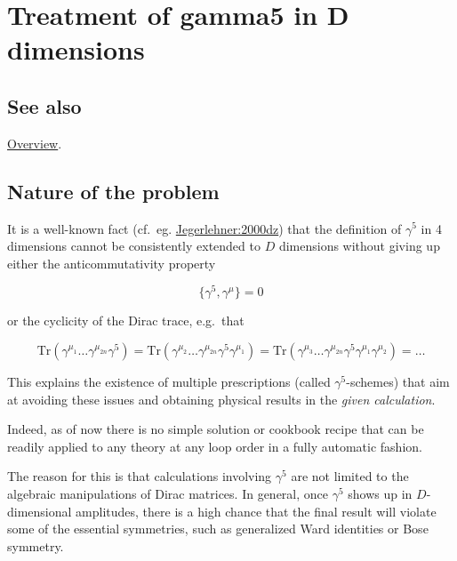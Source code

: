 \documentclass[../FeynCalcManual.tex]{subfiles}
\begin{document}
\hypertarget{treatment of gamma5 in d dimensions}{
\section{Treatment of gamma5 in D dimensions}\label{treatment of gamma5 in d dimensions}}

\subsection{See also}

\hyperlink{toc}{Overview}.

\hypertarget{nature-of-the-problem}{%
\subsection{Nature of the problem}\label{nature-of-the-problem}}

It is a well-known fact (cf.~eg.
\href{https://arxiv.org/pdf/hep-th/0005255}{Jegerlehner:2000dz}) that
the definition of \(\gamma^5\) in 4 dimensions cannot be consistently
extended to \(D\) dimensions without giving up either the
anticommutativity property

\begin{equation}
\{\gamma^5, \gamma^\mu\} = 0
\end{equation}

or the cyclicity of the Dirac trace, e.g.~that

\begin{equation}
\mathrm{Tr}( \gamma^{\mu_1} \ldots \gamma^{\mu_{2n}} \gamma^5 ) = \mathrm{Tr}( \gamma^{\mu_2} \ldots \gamma^{\mu_{2n}} \gamma^5 \gamma^{\mu_1} ) = \mathrm{Tr}( \gamma^{\mu_3} \ldots \gamma^{\mu_{2n}} \gamma^5 \gamma^{\mu_1} \gamma^{\mu_2} ) = \ldots
\end{equation}

This explains the existence of multiple prescriptions (called
\(\gamma^5\)-schemes) that aim at avoiding these issues and obtaining
physical results in the \emph{given calculation}.

Indeed, as of now there is no simple solution or cookbook recipe that
can be readily applied to any theory at any loop order in a fully
automatic fashion.

The reason for this is that calculations involving \(\gamma^5\) are not
limited to the algebraic manipulations of Dirac matrices. In general,
once \(\gamma^5\) shows up in \(D\)-dimensional amplitudes, there is a
high chance that the final result will violate some of the essential
symmetries, such as generalized Ward identities or Bose symmetry.
\end{document}
